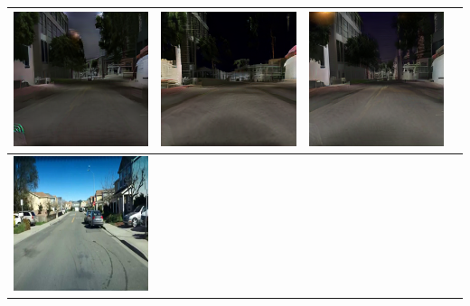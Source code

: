 \documentclass{VUMIFPSkursinis}
\begin{document}
\begin{table}[H]
{\begin{tabular}{|c|c|c|c|}
                \includegraphics[scale=0.35]{img/pvz/1_cycle} & \includegraphics[scale=0.35]{img/pvz/1_cut} & \includegraphics[scale=0.35]{img/pvz/1_mspc}
                \\
                \hline
                \includegraphics[scale=0.35]{img/pvz/3_real} & 

\end{tabular}}
\end{table}
\end{document}
